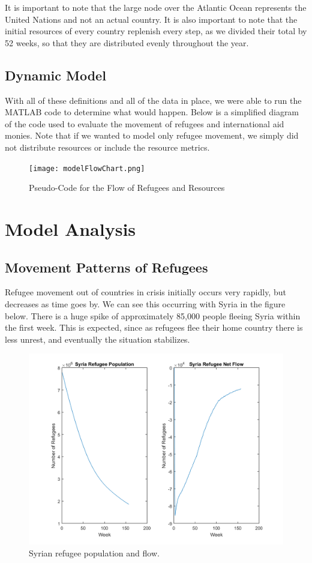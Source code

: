 \documentclass{article}
\begin{document}
It is important to note that the large node over the Atlantic Ocean represents the United Nations and not an actual country. It is also important to note that the initial resources of every country replenish every step, as we divided their total by 52 weeks, so that they are distributed evenly throughout the year.

\subsection{Dynamic Model}
With all of these definitions and all of the data in place, we were able to run the MATLAB code to determine what would happen. Below is a simplified diagram of the code used to evaluate the movement of refugees and international aid monies. Note that if we wanted to model only refugee movement, we simply did not distribute resources or include the resource metrics.

\begin{figure}[H]
    \centering
    \texttt{[image: modelFlowChart.png]}
    \caption [width=0.8\textwidth]{Pseudo-Code for the Flow of Refugees and Resources}
\end{figure}

\section{Model Analysis}

\subsection{Movement Patterns of Refugees}

Refugee movement out of countries in crisis initially occurs very rapidly, but decreases as time goes by. We can see this occurring with Syria in the figure below. There is a huge spike of approximately 85,000 people fleeing Syria within the first week. This is expected, since as refugees flee their home country there is less unrest, and eventually the situation stabilizes.

\begin{figure}[H]
    \centering
    \includegraphics[width=.7\textwidth]{PostRefugeePlots/Syria_RefugeePopandFlow.png}
    \caption [width=0.9\textwidth]{\centering Syrian refugee population and flow.}
\end{figure}
\end{document}
